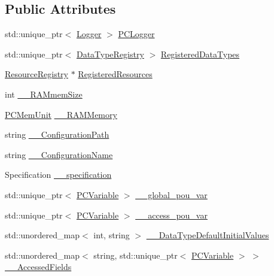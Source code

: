 \subsection*{Public Attributes}
\begin{DoxyCompactItemize}
\item 
std\+::unique\+\_\+ptr$<$ \hyperlink{classpc__emulator_1_1Logger}{Logger} $>$ \hyperlink{classpc__emulator_1_1PCConfiguration_ab74d020cc35875ac3092a4db604ad322}{P\+C\+Logger}
\item 
std\+::unique\+\_\+ptr$<$ \hyperlink{classpc__emulator_1_1DataTypeRegistry}{Data\+Type\+Registry} $>$ \hyperlink{classpc__emulator_1_1PCConfiguration_a1021cb61a4911ed3b0043bc87657b6e5}{Registered\+Data\+Types}
\item 
\hyperlink{classpc__emulator_1_1ResourceRegistry}{Resource\+Registry} $\ast$ \hyperlink{classpc__emulator_1_1PCConfiguration_ac9d21e1ff21b9279867e73675c3b15e9}{Registered\+Resources}
\item 
int \hyperlink{classpc__emulator_1_1PCConfiguration_a266b289b9d885f81f4434eff87bfde9c}{\+\_\+\+\_\+\+R\+A\+Mmem\+Size}
\item 
\hyperlink{classpc__emulator_1_1PCMemUnit}{P\+C\+Mem\+Unit} \hyperlink{classpc__emulator_1_1PCConfiguration_aa77e2c4da7cd2f0fd128402618a9400a}{\+\_\+\+\_\+\+R\+A\+M\+Memory}
\item 
string \hyperlink{classpc__emulator_1_1PCConfiguration_a1032203bcc3b9692c41c9f17baa1b2a5}{\+\_\+\+\_\+\+Configuration\+Path}
\item 
string \hyperlink{classpc__emulator_1_1PCConfiguration_a0d7939a379a14751d3db4da9d3ae009d}{\+\_\+\+\_\+\+Configuration\+Name}
\item 
Specification \hyperlink{classpc__emulator_1_1PCConfiguration_afb61c199d022bb347e22628d27d8b3e7}{\+\_\+\+\_\+specification}
\item 
std\+::unique\+\_\+ptr$<$ \hyperlink{classpc__emulator_1_1PCVariable}{P\+C\+Variable} $>$ \hyperlink{classpc__emulator_1_1PCConfiguration_ad066e891499d290b4334d550f54293b6}{\+\_\+\+\_\+global\+\_\+pou\+\_\+var}
\item 
std\+::unique\+\_\+ptr$<$ \hyperlink{classpc__emulator_1_1PCVariable}{P\+C\+Variable} $>$ \hyperlink{classpc__emulator_1_1PCConfiguration_a55be397558e5ea789f511f70dbf5c710}{\+\_\+\+\_\+access\+\_\+pou\+\_\+var}
\item 
std\+::unordered\+\_\+map$<$ int, string $>$ \hyperlink{classpc__emulator_1_1PCConfiguration_a008356e12ada7e9458284264c41bed79}{\+\_\+\+\_\+\+Data\+Type\+Default\+Initial\+Values}
\item 
std\+::unordered\+\_\+map$<$ string, std\+::unique\+\_\+ptr$<$ \hyperlink{classpc__emulator_1_1PCVariable}{P\+C\+Variable} $>$ $>$ \hyperlink{classpc__emulator_1_1PCConfiguration_a673c9e6b3e2c925134462737cef07eae}{\+\_\+\+\_\+\+Accessed\+Fields}
\end{DoxyCompactItemize}


